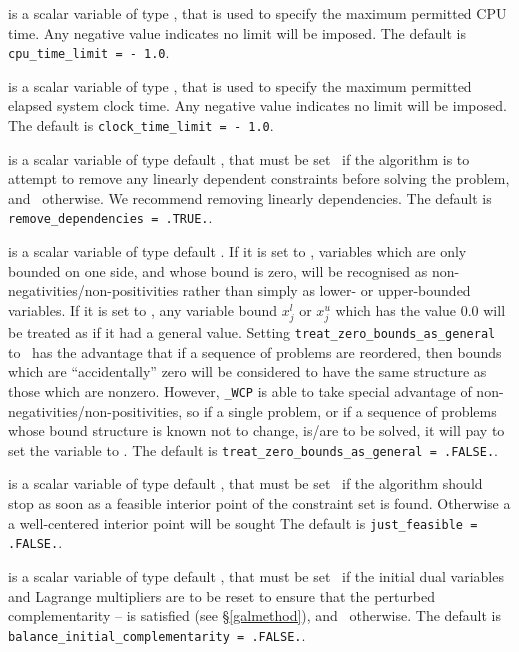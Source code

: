 \documentclass{galahad}
\newcommand{\packagename}{WCP}
\newcommand{\fullpackagename}{\libraryname\_\-\packagename}
\begin{document}
\begin{description}
 is a scalar variable of type \realdp, 
that is used to specify the maximum permitted CPU time. Any negative
value indicates no limit will be imposed. The default is 
{\tt cpu\_time\_limit = - 1.0}.

 is a scalar variable of type \realdp, 
that is used to specify the maximum permitted elapsed system clock time. 
Any negative value indicates no limit will be imposed. The default is 
{\tt clock\_time\_limit = - 1.0}.

 is a scalar variable of type 
default \logical, that must be set \true\ if the algorithm
is to attempt to remove any linearly dependent constraints before
solving the problem, and \false\ otherwise. 
We recommend removing linearly dependencies.
The default is {\tt remove\_dependencies = .TRUE.}.

 is a scalar variable of type 
default \logical.
If it is set to \false, variables which 
are only bounded on one side, and whose bound is zero,
will be recognised as non-negativities/non-positivities rather than simply as
lower- or upper-bounded variables.
If it is set to \true, any variable bound 
$x_{j}^{l}$ or $x_{j}^{u}$ which has the value 0.0 will be
treated as if it had a general value.
Setting {\tt treat\_zero\_bounds\_as\_general} to \true\ has the advantage
that if a sequence of problems are reordered, then bounds which are
``accidentally'' zero will be considered to have the same structure as
those which are nonzero. However, {\tt \fullpackagename} is
able to take special advantage of non-negativities/non-positivities, so
if a single problem, or if a sequence of problems whose 
bound structure is known not to change, is/are to be solved, 
it will pay to set the variable to \false.
The default is {\tt treat\_zero\_bounds\_as\_general = .FALSE.}.

 is a scalar variable of type default \logical, that 
must be set \true\ if the algorithm should stop as soon as a feasible 
interior point of the constraint set is found. Otherwise a a well-centered
interior point will be sought
The default is {\tt just\_feasible = .FALSE.}.

 is a scalar variable of type 
default \logical, that must be set \true\ if the initial dual variables
and Lagrange multipliers are to be reset to ensure that the
perturbed complementarity --
is satisfied (see \S\ref{galmethod}), and \false\ otherwise.
The default is {\tt balance\_initial\_complementarity = .FALSE.}.


\end{description}
\end{document}
